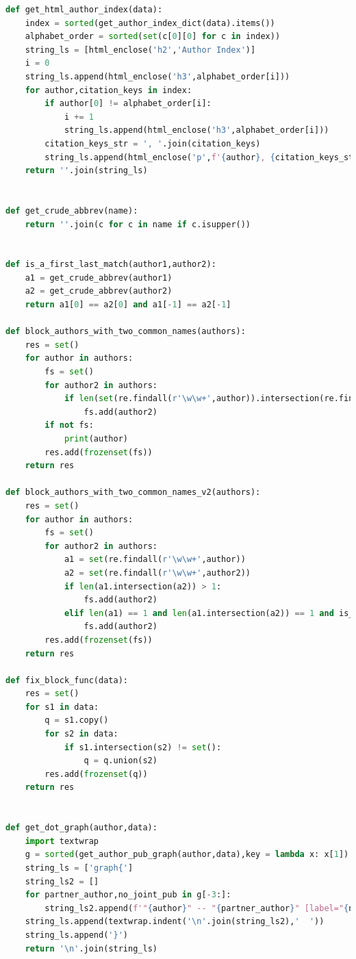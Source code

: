 \documentclass[11pt,a4paper]{report}
\begin{document}
\begin{appendices}
\begin{lstlisting}[language=python]
def get_html_author_index(data):
    index = sorted(get_author_index_dict(data).items())
    alphabet_order = sorted(set(c[0][0] for c in index))
    string_ls = [html_enclose('h2','Author Index')]
    i = 0
    string_ls.append(html_enclose('h3',alphabet_order[i]))
    for author,citation_keys in index:
        if author[0] != alphabet_order[i]:
            i += 1
            string_ls.append(html_enclose('h3',alphabet_order[i]))
        citation_keys_str = ', '.join(citation_keys)
        string_ls.append(html_enclose('p',f'{author}, {citation_keys_str}'))
    return ''.join(string_ls)


def get_crude_abbrev(name):
    return ''.join(c for c in name if c.isupper())


def is_a_first_last_match(author1,author2):
    a1 = get_crude_abbrev(author1)
    a2 = get_crude_abbrev(author2)
    return a1[0] == a2[0] and a1[-1] == a2[-1]

def block_authors_with_two_common_names(authors):
    res = set()
    for author in authors:
        fs = set()
        for author2 in authors:
            if len(set(re.findall(r'\w\w+',author)).intersection(re.findall(r'\w\w+',author2))) > 1:
                fs.add(author2)
        if not fs:
            print(author)
        res.add(frozenset(fs))
    return res

def block_authors_with_two_common_names_v2(authors):
    res = set()
    for author in authors:
        fs = set()
        for author2 in authors:
            a1 = set(re.findall(r'\w\w+',author))
            a2 = set(re.findall(r'\w\w+',author2))
            if len(a1.intersection(a2)) > 1:
                fs.add(author2)
            elif len(a1) == 1 and len(a1.intersection(a2)) == 1 and is_a_first_last_match(author,author2):
                fs.add(author2)
        res.add(frozenset(fs))
    return res

def fix_block_func(data):
    res = set()
    for s1 in data:
        q = s1.copy()
        for s2 in data:
            if s1.intersection(s2) != set():
                q = q.union(s2)
        res.add(frozenset(q))
    return res


def get_dot_graph(author,data):
    import textwrap
    g = sorted(get_author_pub_graph(author,data),key = lambda x: x[1])
    string_ls = ['graph{']
    string_ls2 = []
    for partner_author,no_joint_pub in g[-3:]:
        string_ls2.append(f'"{author}" -- "{partner_author}" [label="{no_joint_pub}"]')
    string_ls.append(textwrap.indent('\n'.join(string_ls2),'  '))
    string_ls.append('}')
    return '\n'.join(string_ls)



\end{lstlisting}
\end{appendices}
\end{document}
